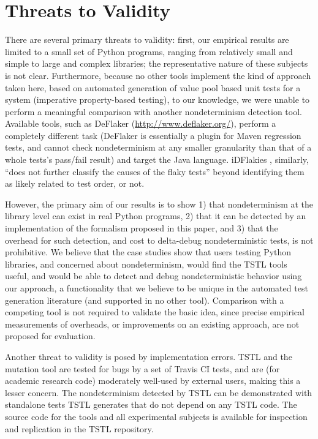 \section{Threats to Validity}

There are several primary threats to validity:  first, our empirical
results are limited to a small set of Python programs, ranging from
relatively small and simple to large and complex libraries; the
representative nature of these subjects is not clear.
Furthermore, because
no other tools implement the kind of approach taken here, based on
automated generation of value pool based unit tests for a system
(imperative property-based testing), to our knowledge, we were unable
to perform a meaningful comparison with another nondeterminism
detection tool.  Available tools, such as DeFlaker \cite{bell2018d}
(\url{http://www.deflaker.org/}), perform a completely different task (DeFlaker
is essentially a plugin for Maven regression tests, and cannot check
nondeterminism at any smaller granularity than that of a whole tests's
pass/fail result) and target the Java language.  iDFlakies
\cite{idflakies}, similarly, ``does not further classify the causes of
the flaky tests'' beyond identifying them as likely related to test
order, or not.

However, the primary
aim of our results is to show 1) that nondeterminism at the library
level can exist in real Python programs, 2) that it can be detected
by an implementation of the formalism proposed in this paper, and 3)
that the overhead for such detection, and cost to delta-debug
nondeterministic tests, is not prohibitive.  We believe that the case
studies show that users testing Python libraries, and concerned about
nondeterminism, would find the TSTL tools useful, and would be able to
detect and debug nondeterministic behavior using our approach, a
functionality that we believe to be unique in the automated test generation
literature (and supported in no other tool).  Comparison with a
competing tool is not required to validate the basic idea, since
precise empirical measurements of overheads, or improvements on an
existing approach, are not proposed for evaluation.

Another threat to validity is posed by implementation errors.
TSTL and the mutation tool are tested for bugs by a set of Travis CI
tests, and are (for academic research code) moderately well-used by
external users, making this a lesser concern.  The nondeterminism
detected by TSTL can be demonstrated with standalone tests TSTL
generates that do not depend on any TSTL code.
The source code for the tools and all experimental subjects is
available for inspection and replication in the TSTL repository.